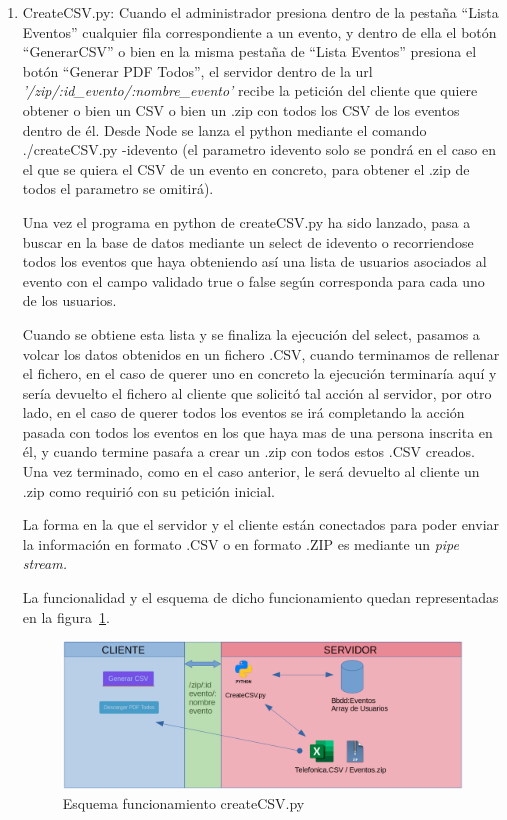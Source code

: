 \documentclass[a4paper, 12pt]{book}
\begin{document}
\begin{enumerate}
  	\item CreateCSV.py: Cuando el administrador presiona dentro de la pestaña ``Lista Eventos'' cualquier fila correspondiente a un evento, y dentro de ella el botón ``GenerarCSV'' o bien en la misma pestaña de ``Lista Eventos'' presiona el botón ``Generar PDF Todos'', el servidor dentro de la url \textit{'/zip/:id\_evento/:nombre\_evento'} recibe la petición del cliente que quiere obtener o bien un CSV o bien un .zip con todos los CSV de los eventos dentro de él. Desde Node se lanza el python mediante el comando ./createCSV.py -idevento (el parametro idevento solo se pondrá en el caso en el que se quiera el CSV de un evento en concreto, para obtener el .zip de todos el parametro se omitirá).
  	
  	Una vez el programa en python de createCSV.py ha sido lanzado, pasa a buscar en la base de datos mediante un select de idevento o recorriendose todos los eventos que haya obteniendo así una lista de usuarios asociados al evento con el campo validado true o false según corresponda para cada uno de los usuarios.
  	
  	Cuando se obtiene esta lista y se finaliza la ejecución del select, pasamos a volcar los datos obtenidos en un fichero .CSV, cuando terminamos de rellenar el fichero, en el caso de querer uno en concreto la ejecución terminaría aquí y sería devuelto el fichero al cliente que solicitó tal acción al servidor, por otro lado, en el caso de querer todos los eventos se irá completando la acción pasada con todos los eventos en los que haya mas de una persona inscrita en él, y cuando termine pasaŕa a crear un .zip con todos estos .CSV creados. Una vez terminado, como en el caso anterior, le será devuelto al cliente un .zip como requirió con su petición inicial.
  	
  	La forma en la que el servidor y el cliente están conectados para poder enviar la información en formato .CSV o en formato .ZIP es mediante un \textit{pipe stream.}
  	
  	La funcionalidad y el esquema de dicho funcionamiento quedan representadas en la figura~\ref{fig:createCSV}.

\begin{figure}
  \centering
  \includegraphics[width=16cm, keepaspectratio]{img/createCSV.png}
  	\caption{Esquema funcionamiento createCSV.py}\label{fig:createCSV}
\end{figure}  	
  	

\end{enumerate}
\end{document}
